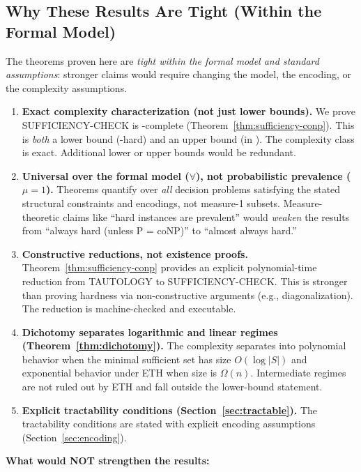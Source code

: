 \subsection*{Why These Results Are Tight (Within the Formal Model)}

The theorems proven here are \emph{tight within the formal model and standard assumptions}: stronger claims would require changing the model, the encoding, or the complexity assumptions.

\begin{enumerate}
\item \textbf{Exact complexity characterization (not just lower bounds).} We prove SUFFICIENCY-CHECK is \coNP-complete (Theorem~\ref{thm:sufficiency-conp}). This is \emph{both} a lower bound (\coNP-hard) and an upper bound (in \coNP). The complexity class is exact. Additional lower or upper bounds would be redundant.

\item \textbf{Universal over the formal model ($\forall$), not probabilistic prevalence ($\mu = 1$).} Theorems quantify over \emph{all} decision problems satisfying the stated structural constraints and encodings, not measure-1 subsets. Measure-theoretic claims like ``hard instances are prevalent'' would \emph{weaken} the results from ``always hard (unless P = coNP)'' to ``almost always hard.''

\item \textbf{Constructive reductions, not existence proofs.} Theorem~\ref{thm:sufficiency-conp} provides an explicit polynomial-time reduction from TAUTOLOGY to SUFFICIENCY-CHECK. This is stronger than proving hardness via non-constructive arguments (e.g., diagonalization). The reduction is machine-checked and executable.

\item \textbf{Dichotomy separates logarithmic and linear regimes (Theorem~\ref{thm:dichotomy}).} The complexity separates into polynomial behavior when the minimal sufficient set has size $O(\log |S|)$ and exponential behavior under ETH when size is $\Omega(n)$. Intermediate regimes are not ruled out by ETH and fall outside the lower-bound statement.

\item \textbf{Explicit tractability conditions (Section~\ref{sec:tractable}).} The tractability conditions are stated with explicit encoding assumptions (Section~\ref{sec:encoding}).
\end{enumerate}

\textbf{What would NOT strengthen the results:}

